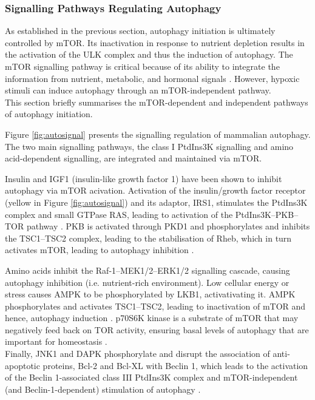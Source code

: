             
            
            
            


    
    \subsubsection{Signalling Pathways Regulating Autophagy}

    As established in the previous section, autophagy initiation is ultimately controlled by mTOR. Its inactivation in response to nutrient depletion results in the activation of the ULK complex and thus the induction of autophagy. The mTOR signalling pathway is critical because of its ability to integrate the information from nutrient, metabolic, and hormonal signals \cite{lamb2013}.  However, hypoxic stimuli can induce autophagy through an mTOR-independent pathway.\\ 
    This section briefly summarises the mTOR-dependent and independent pathways of autophagy initiation. 
    
    
    \newpage
    Figure \ref{fig:autosignal} presents the signalling regulation of mammalian autophagy. The two main signalling pathways, the class I PtdIns3K signalling and amino acid-dependent signalling, are integrated and maintained via mTOR. 
    
    Insulin and IGF1 (insulin-like growth factor 1) have been shown to inhibit autophagy via mTOR acivation. Activation of the insulin/growth factor receptor (yellow in Figure \ref{fig:autosignal}) and its adaptor, IRS1, stimulates the PtdIns3K complex and small GTPase RAS, leading to activation of the PtdIns3K–PKB–TOR pathway \cite{Yang2010}. PKB is activated through PKD1 and phosphorylates and inhibits the TSC1–TSC2 complex, leading to the stabilisation of Rheb, which in turn activates mTOR, leading to autophagy inhibition \cite{meijer2004regulation,Yang2010a}.
    
     Amino acids inhibit the Raf-1–MEK1/2–ERK1/2 signalling cascade, causing autophagy inhibition (i.e. nutrient-rich environment). Low cellular energy or stress causes AMPK to be phosphorylated by LKB1, activativating it. AMPK phosphorylates and activates TSC1–TSC2, leading to inactivation of mTOR and hence, autophagy induction \cite{Kroemer2010}. p70S6K kinase is a substrate of mTOR that may negatively feed back on TOR activity, ensuring basal levels of autophagy that are important for homeostasis \cite{Yang2010a}. \\
     Finally, JNK1 and DAPK phosphorylate and disrupt the association of anti-apoptotic proteins, Bcl-2 and Bcl-XL with Beclin 1, which leads to the activation of the Beclin 1-associated class III PtdIns3K complex and mTOR-independent (and Beclin-1-dependent) stimulation of autophagy \cite{wei2008jnk1}. \\
    
